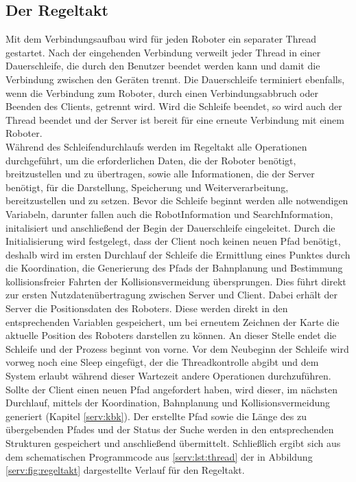 \subsection{Der Regeltakt}\label{serv:regeltakt}

Mit dem Verbindungsaufbau wird für jeden Roboter ein separater Thread gestartet. Nach der eingehenden Verbindung verweilt jeder Thread in einer Dauerschleife, die durch den Benutzer beendet werden kann und damit die Verbindung zwischen den Geräten trennt. Die Dauerschleife terminiert ebenfalls, wenn die Verbindung zum Roboter, durch einen Verbindungsabbruch oder Beenden des Clients, getrennt wird. Wird die Schleife beendet, so wird auch der Thread beendet und der Server ist bereit für eine erneute Verbindung mit einem Roboter. \\

Während des Schleifendurchlaufs werden im Regeltakt alle Operationen
durchgeführt, um die erforderlichen Daten, die der Roboter benötigt,
breitzustellen und zu übertragen, sowie alle Informationen, die der Server
benötigt, für die Darstellung, Speicherung und Weiterverarbeitung,
bereitzustellen und zu setzen. Bevor die Schleife beginnt werden alle
notwendigen Variabeln, darunter fallen auch die RobotInformation und
SearchInformation, initalisiert und anschließend der Begin der Dauerschleife
eingeleitet. Durch die Initialisierung wird festgelegt, dass der Client noch
keinen neuen Pfad benötigt, deshalb wird im ersten Durchlauf der Schleife die
Ermittlung eines Punktes durch die Koordination, die Generierung des Pfads der
Bahnplanung und Bestimmung kollisionsfreier Fahrten der Kollisionsvermeidung
übersprungen. Dies führt direkt zur ersten Nutzdatenübertragung zwischen Server
und Client. Dabei erhält der Server die Positionsdaten des Roboters. Diese
werden direkt in den entsprechenden Variablen gespeichert, um bei erneutem
Zeichnen der Karte die aktuelle Position des Roboters darstellen zu können. An
dieser Stelle endet die Schleife und der Prozess beginnt von vorne. Vor dem
Neubeginn der Schleife wird vorweg noch eine Sleep eingefügt, der die Threadkontrolle abgibt und dem System erlaubt während dieser Wartezeit andere Operationen durchzuführen. Sollte der Client einen neuen Pfad angefordert haben, wird dieser, im nächsten Durchlauf, mittels der Koordination, Bahnplanung und Kollisionsvermeidung generiert (Kapitel \ref{serv:kbk}). Der erstellte Pfad sowie die Länge des zu übergebenden Pfades und der Status der Suche werden in den entsprechenden Strukturen gespeichert und anschließend übermittelt. Schließlich ergibt sich aus dem schematischen Programmcode aus \ref{serv:lst:thread} der in Abbildung \ref{serv:fig:regeltakt} dargestellte Verlauf für den Regeltakt.\\


